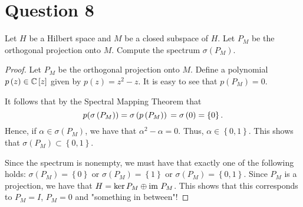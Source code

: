 \section{Question 8}

\horz

Let $H$ be a Hilbert space and $M$ be a closed subspace of $H$. Let $P_M$ be the orthogonal projection onto $M.$ Compute the spectrum $\sigma(P_M).$

\horz

\begin{proof}
    Let $P_{M}$ be the orthogonal projection onto $M$. Define a polynomial $p\left( z \right) \in \mathbb C \left[ z \right]$ given by $p\left( z \right) = z^{2} - z$. It is easy to see that $p\left( P_{M} \right) = 0$.
    
    It follows that by the Spectral Mapping Theorem that
    \begin{equation*}
	p(\sigma \left( P_{M} \right)) = \sigma \left( p\left( P_{M} \right) \right) \\
	= \sigma \left( 0 \right) = \left\{ 0 \right\}.
    \end{equation*}
    Hence, if $\alpha \in \sigma \left( P_{M} \right)$, we have that $\alpha^{2} - \alpha = 0$. Thus, $\alpha \in \left\{ 0,1 \right\}$. This shows that $\sigma \left( P_{M} \right) \subset \left\{ 0,1 \right\}$.

    Since the spectrum is nonempty, we must have that exactly one of the following holds: $\sigma \left( P_{M} \right)= \left\{ 0 \right\}$ or $\sigma \left( P_{M} \right) = \left\{ 1 \right\}$ or $\sigma \left( P_{M} \right) = \left\{ 0,1 \right\}$. Since $P_{M}$ is a projection, we have that $H= \ker P_{M} \oplus {\text{im }} P_{M}$. This shows that this corresponds to $P_{M}=I$, $P_{M}=0$ and "something in between"!
\end{proof}

